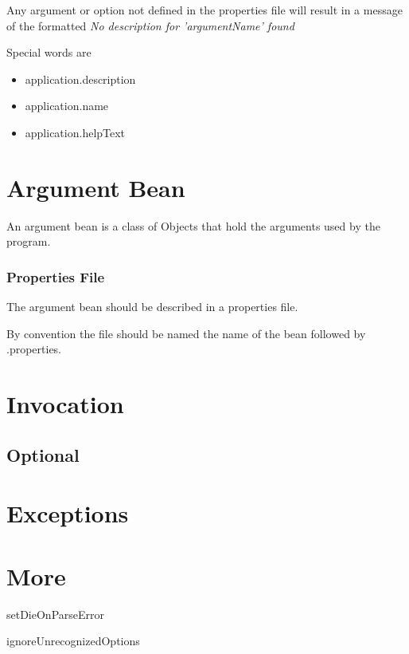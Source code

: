 \documentclass[a4paper,10pt]{article}
\begin{document}
Any argument or option not defined in the properties file will result in a message of the formatted
\textit{No description for 'argumentName' found}

Special words are
\begin{itemize}
 \item application.description
 \item application.name
 \item application.helpText
\end{itemize}



\section{Argument Bean}
An argument bean is a class of Objects that hold the arguments used by the program.
\subsubsection{Properties File}
The argument bean should be described in a properties file.

By convention the file should be named the name of the bean followed by .properties.
 

\section{Invocation}
\subsection{Optional}

\section{Exceptions}

\section{More}
setDieOnParseError

ignoreUnrecognizedOptions
\end{document}
